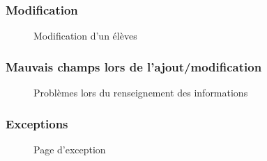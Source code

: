 \documentclass[a4paper,12pt]{article}
\begin{document}
\subsubsection{Modification}
	\begin{figure}[H]
		\center
		\caption{Modification d'un élèves}
	\end{figure}

\subsubsection{Mauvais champs lors de l'ajout/modification}
	\begin{figure}[H]
		\center
		\caption{Problèmes lors du renseignement des informations}
\end{figure}
	

\subsubsection{Exceptions}
	\begin{figure}[H]
		\center
		\caption{Page d'exception}
	\end{figure}
	
\end{document}
